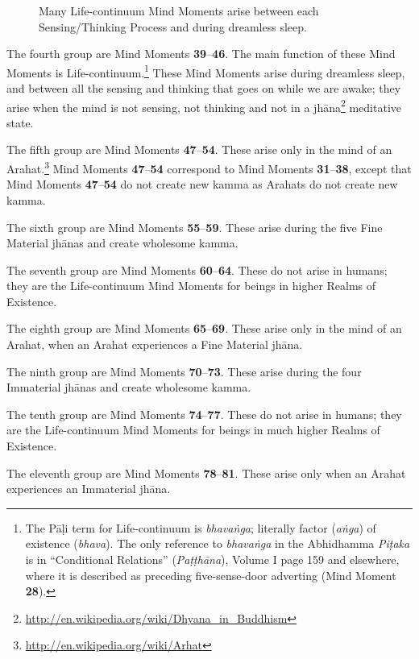 \begin{figure}[h]
\centering

\caption{Many Life-continuum Mind Moments arise between each Sensing/Thinking Process and during dreamless sleep.}
\label{fig:Life_Cont}
\end{figure}

The fourth group are Mind Moments \textbf{39}--\textbf{46}. The main function of these Mind Moments is Life-continuum.\footnote{The Pāḷi term for Life-continuum is \textit{bhavaṅga}; literally factor (\textit{aṅga}) of existence (\textit{bhava}). The only reference to \textit{bhavaṅga} in the Abhidhamma \textit{Piṭaka} is in “Conditional Relations” (\textit{Paṭṭhāna}), Volume I page 159 and elsewhere, where it is described as preceding five-sense-door adverting (Mind Moment \textbf{28}).} These Mind Moments arise during dreamless sleep, and between all the sensing and thinking that goes on while we are awake; they arise when the mind is not sensing, not thinking and not in a jhāna\footnote{\url{http://en.wikipedia.org/wiki/Dhyana_in_Buddhism}} meditative state.

The fifth group are Mind Moments \textbf{47}--\textbf{54}. These arise only in the mind of an Arahat.\footnote{\url{http://en.wikipedia.org/wiki/Arhat}} Mind Moments \textbf{47}--\textbf{54} correspond to Mind Moments \textbf{31}--\textbf{38}, except that Mind Moments \textbf{47}--\textbf{54} do not create new kamma as Arahats do not create new kamma.

The sixth group are Mind Moments \textbf{55}--\textbf{59}. These arise during the five Fine Material jhānas and create wholesome kamma.

The seventh group are Mind Moments \textbf{60}--\textbf{64}. These do not arise in humans; they are the Life-continuum Mind Moments for beings in higher Realms of Existence.

The eighth group are Mind Moments \textbf{65}--\textbf{69}. These arise only in the mind of an Arahat, when an Arahat experiences a Fine Material jhāna.

The ninth group are Mind Moments \textbf{70}--\textbf{73}. These arise during the four Immaterial jhānas and create wholesome kamma.

The tenth group are Mind Moments \textbf{74}--\textbf{77}. These do not arise in humans; they are the Life-continuum Mind Moments for beings in much higher Realms of Existence.

The eleventh group are Mind Moments \textbf{78}--\textbf{81}. These arise only when an Arahat experiences an Immaterial jhāna.

